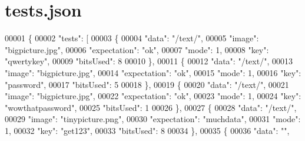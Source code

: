 \hypertarget{tests_8json}{\section{tests.\-json}
\label{tests_8json}
}

\begin{DoxyCode}
00001 \{
00002     \textcolor{stringliteral}{"tests"}: [
00003         \{
00004             \textcolor{stringliteral}{"data"}: \textcolor{stringliteral}{"/text/"},
00005             \textcolor{stringliteral}{"image"}: \textcolor{stringliteral}{"bigpicture.jpg"},
00006             \textcolor{stringliteral}{"expectation"}: \textcolor{stringliteral}{"ok"},
00007             \textcolor{stringliteral}{"mode"}: 1,
00008             \textcolor{stringliteral}{"key"}: \textcolor{stringliteral}{"qwertykey"},
00009             \textcolor{stringliteral}{"bitsUsed"}: 8
00010         \},
00011         \{
00012             \textcolor{stringliteral}{"data"}: \textcolor{stringliteral}{"/text/"},
00013             \textcolor{stringliteral}{"image"}: \textcolor{stringliteral}{"bigpicture.jpg"},
00014             \textcolor{stringliteral}{"expectation"}: \textcolor{stringliteral}{"ok"},
00015             \textcolor{stringliteral}{"mode"}: 1,
00016             \textcolor{stringliteral}{"key"}: \textcolor{stringliteral}{"password"},
00017             \textcolor{stringliteral}{"bitsUsed"}: 5
00018         \},
00019         \{
00020             \textcolor{stringliteral}{"data"}: \textcolor{stringliteral}{"/text/"},
00021             \textcolor{stringliteral}{"image"}: \textcolor{stringliteral}{"bigpicture.jpg"},
00022             \textcolor{stringliteral}{"expectation"}: \textcolor{stringliteral}{"ok"},
00023             \textcolor{stringliteral}{"mode"}: 1,
00024             \textcolor{stringliteral}{"key"}: \textcolor{stringliteral}{"wowthatpassword"},
00025             \textcolor{stringliteral}{"bitsUsed"}: 1
00026         \},
00027         \{
00028             \textcolor{stringliteral}{"data"}: \textcolor{stringliteral}{"/text/"},
00029             \textcolor{stringliteral}{"image"}: \textcolor{stringliteral}{"tinypicture.png"},
00030             \textcolor{stringliteral}{"expectation"}: \textcolor{stringliteral}{"muchdata"},
00031             \textcolor{stringliteral}{"mode"}: 1,
00032             \textcolor{stringliteral}{"key"}: \textcolor{stringliteral}{"get123"},
00033             \textcolor{stringliteral}{"bitsUsed"}: 8
00034         \},
00035         \{
00036             \textcolor{stringliteral}{"data"}: \textcolor{stringliteral}{""},

\end{DoxyCode}
